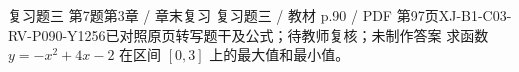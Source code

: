 \par\noindent\begin{minipage}{\linewidth}
\begin{bankitem}{复习题三 第7题}{第3章 / 章末复习 复习题三 / 教材 p.90 / PDF 第97页}{XJ-B1-C03-RV-P090-Y1256}{已对照原页转写题干及公式；待教师复核；未制作答案}
求函数 $y=-x^2+4x-2$ 在区间 $[0,3]$ 上的最大值和最小值。
\end{bankitem}
\end{minipage}\par\medskip
